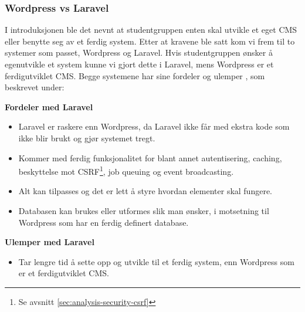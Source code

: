 \subsubsection{Wordpress vs Laravel}
\label{sec:wordpressvslaravel}
I introduksjonen ble det nevnt at studentgruppen enten skal utvikle et eget CMS eller benytte seg av et ferdig system. Etter at kravene ble satt kom vi frem til to systemer som passet, Wordpress og Laravel. Hvis studentgruppen ønsker å egenutvikle et system kunne vi gjort dette i Laravel, mens Wordpress er et ferdigutviklet CMS. Begge systemene har sine fordeler og ulemper \cite{cbcp2019lvw}, som beskrevet under:

\textbf{Fordeler med Laravel}
\begin{itemize}
    \item Laravel er raskere enn Wordpress, da Laravel ikke får med ekstra kode som ikke blir brukt og gjør systemet tregt.
    \item Kommer med ferdig funksjonalitet for blant annet autentisering, caching, beskyttelse mot CSRF\footnote{Se avsnitt \ref{sec:analysis-security-csrf}}, job queuing og event broadcasting.
    \item Alt kan tilpasses og det er lett å styre hvordan elementer skal fungere.
    \item Databasen kan brukes eller utformes slik man ønsker, i motsetning til Wordpress som har en ferdig definert database.
\end{itemize}

\textbf{Ulemper med Laravel}
\begin{itemize}
    \item Tar lengre tid å sette opp og utvikle til et ferdig system, enn Wordpress som er et ferdigutviklet CMS.
\end{itemize}

